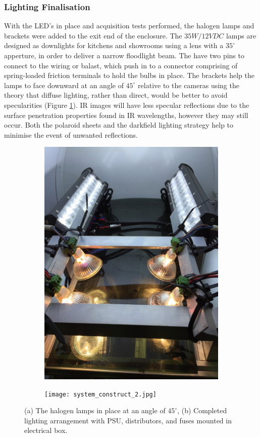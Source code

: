 \documentclass[fleqn,twoside,12pt]{report}
\begin{document}
\subsubsection{Lighting Finalisation}


With the LED's in place and acquisition tests performed, the halogen lamps and brackets were added to the exit end of the enclosure. The $35W/12VDC$ lamps are designed as downlights for kitchens and showrooms using a lens with a $35^{\circ}$ apperture, in order to deliver a narrow floodlight beam. The have two pins to connect to the wiring or balast, which push in to a connector comprising of spring-loaded friction terminals to hold the bulbs in place. The brackets help the lamps to face downward at an angle of $45^{\circ}$ relative to the cameras using the theory that diffuse lighting, rather than direct, would be better to avoid specularities (Figure \ref{fig:halogen}). IR images will have less specular reflections due to the surface penetration properties found in IR wavelengths, however they may still occur. Both the polaroid sheets and the darkfield lighting strategy help to minimise the event of unwanted reflections.

\begin{figure}[ht]
	\centering
	\begin{subfigure}{.5\textwidth}
		\centering
		\includegraphics[width=.8\linewidth, angle=270]{halogen.jpg}
		\caption{}
		\label{fig:halogen}
	\end{subfigure}%
	\begin{subfigure}{.5\textwidth}
		\centering
		\texttt{[image: system\_construct\_2.jpg]}
		\caption{}
		\label{fig:lights_power}
	\end{subfigure}%

	\caption{(a) The halogen lamps in place at an angle of $45^{\circ}$, (b) Completed lighting arrangement with PSU, distributors, and fuses mounted in electrical box.}
	\label{}
\end{figure}
\end{document}
